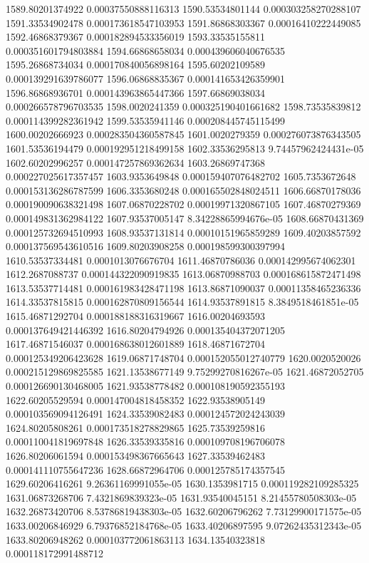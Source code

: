 {1589.80201374922 0.00037550888116313
1590.53534801144 0.000303258270288107
1591.33534902478 0.000173618547103953
1591.86868303367 0.00016410222449085
1592.46868379367 0.000182894533356019
1593.33535155811 0.000351601794803884
1594.66868658034 0.000439606040676535
1595.26868734034 0.000170840056898164
1595.60202109589 0.000139291639786077
1596.06868835367 0.000141653426359901
1596.86868936701 0.000143963865447366
1597.66869038034 0.000266578796703535
1598.0020241359 0.000325190401661682
1598.73535839812 0.000114399282361942
1599.53535941146 0.000208445745115499
1600.00202666923 0.000283504360587845
1601.0020279359 0.000276073876343505
1601.53536194479 0.000192951218499158
1602.33536295813 9.74457962424431e-05
1602.60202996257 0.000147257869362634
1603.26869747368 0.000227025617357457
1603.9353649848 0.000159407076482702
1605.7353672648 0.000153136286787599
1606.3353680248 0.000165502848024511
1606.66870178036 0.000190090638321498
1607.06870228702 0.00019971320867105
1607.46870279369 0.000149831362984122
1607.93537005147 8.34228865994676e-05
1608.66870431369 0.000125732694510993
1608.93537131814 0.00010151965859289
1609.40203857592 0.000137569543610516
1609.80203908258 0.000198599300397994
1610.53537334481 0.0001013076676704
1611.46870786036 0.000142995674062301
1612.2687088737 0.000144322090919835
1613.06870988703 0.000168615872471498
1613.53537714481 0.000161983428471198
1613.86871090037 0.00011358465236336
1614.33537815815 0.000162870809156544
1614.93537891815 8.3849518461851e-05
1615.46871292704 0.000188188316319667
1616.00204693593 0.000137649421446392
1616.80204794926 0.000135404372071205
1617.46871546037 0.000168638012601889
1618.46871672704 0.000125349206423628
1619.06871748704 0.000152055012740779
1620.0020520026 0.000215129869825585
1621.13538677149 9.75299270816267e-05
1621.46872052705 0.000126690130468005
1621.93538778482 0.000108190592355193
1622.60205529594 0.000147004818458352
1622.93538905149 0.000103569094126491
1624.33539082483 0.000124572024243039
1624.80205808261 0.000173518278829865
1625.73539259816 0.000110041819697848
1626.33539335816 0.000109708196706078
1626.80206061594 0.000153498367665643
1627.33539462483 0.000141110755647236
1628.66872964706 0.000125785174357545
1629.60206416261 9.26361169991055e-05
1630.1353981715 0.000119282109285325
1631.06873268706 7.4321869839323e-05
1631.93540045151 8.21455780508303e-05
1632.26873420706 8.53786819438303e-05
1632.60206796262 7.73129900171575e-05
1633.00206846929 6.79376852184768e-05
1633.40206897595 9.07262435312343e-05
1633.80206948262 0.000103772061863113
1634.13540323818 0.000118172991488712
}
